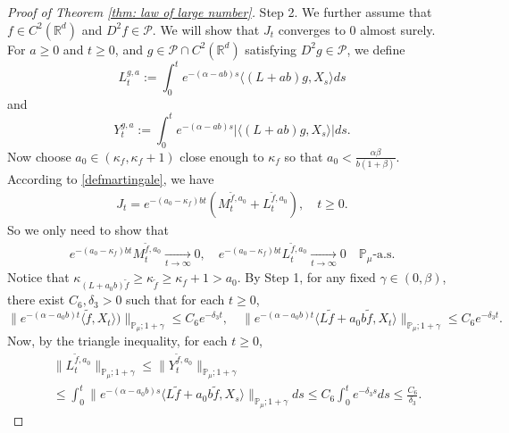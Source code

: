 \documentclass[12pt,a4paper]{amsart}
\theoremstyle{plain}
\theoremstyle{definition}
\numberwithin{equation}{section}
\begin{document}
\begin{proof}[Proof of Theorem \ref{thm: law of large number}]
	Step 2.
    We further assume that $f\in C^2(\mathbb R^d)$ and $D^2f \in \mathcal{P}$. 
    We will show that $J_t$ converges to $0$ almost surely.
	For $a \geq 0$ and $ t\geq 0$, and $g\in \mathcal{P}\cap C^2(\mathbb{R}^d)$ satisfying $D^2g\in \mathcal{P}$, we define
\begin{equation}
	L_t^{g,a}:=\int_0^t e^{-(\alpha-ab)s}\langle (L+ab)g,X_s\rangle ds
\end{equation}
    and
\begin{equation}
    Y_t^{g,a}
    :=\int_0^t e^{-(\alpha-ab)s}|\langle (L+ab)g,X_s\rangle|ds.
\end{equation}
	Now choose $a_0 \in (\kappa_{f}, \kappa_f + 1)$ close enough to $\kappa_f$ so that $a_0 < \frac{\alpha \beta}{b(1+\beta)}$.
	According to \eqref{defmartingale}, we have
\begin{align}
    J_t
    =e^{-(a_0-\kappa_f)bt} (M_t^{\tilde{f}, a_0}+L_t^{\tilde{f}, a_0}),
    \quad t\geq 0.
\end{align}
	So we only need to show that
\begin{align}
    e^{-(a_0-\kappa_f)b t}M_t^{\tilde{f},a_0}
    \xrightarrow[t\to \infty]{} 0,
    \quad e^{-(a_0-\kappa_f)b t}L_t^{\tilde{f},a_0}
    \xrightarrow[t\to \infty]{} 0
    \quad \mathbb{P}_{\mu}\text{-a.s.}
\end{align}
    Notice that $\kappa_{(L+a_0 b)\tilde{f}}\geq \kappa_{\tilde{f}}\geq \kappa_f+1 > a_0$.
By Step 1, for any fixed $\gamma\in (0,\beta)$, there exist $C_6, \delta_3>0$ such that for each $t\geq 0$,
\begin{equation}
    \|e^{-(\alpha-a_0 b)t}\langle \tilde{f},X_t\rangle)\|_{\mathbb{P}_{\mu};1+\gamma}
    \leq C_6 e^{-\delta_3 t},
    \quad \|e^{-(\alpha-a_0 b)t}\langle L\tilde{f}+a_0 b\tilde{f},X_t\rangle\|_{\mathbb{P}_{\mu};1+\gamma}
    \leq C_6 e^{-\delta_3 t}.
\end{equation}
	Now, by the triangle inequality, for each $t\geq 0$,
\begin{align}
    &\|L_t^{\tilde{f},a_0}\|_{\mathbb{P}_{\mu};1+\gamma}
    \leq\|Y_t^{\tilde{f},a_0}\|_{\mathbb{P}_{\mu};1+\gamma}
    \\&\leq \int_0^t \|e^{-(\alpha-a_0 b)s}\langle L\tilde{f}+a_0 b\tilde{f},X_s\rangle\|_{\mathbb{P}_{\mu};1+\gamma}ds\leq C_6 \int_0^t e^{-\delta_3 s}ds\leq\frac{C_6}{\delta_3}.
\end{align}

\end{proof}
\end{document}
